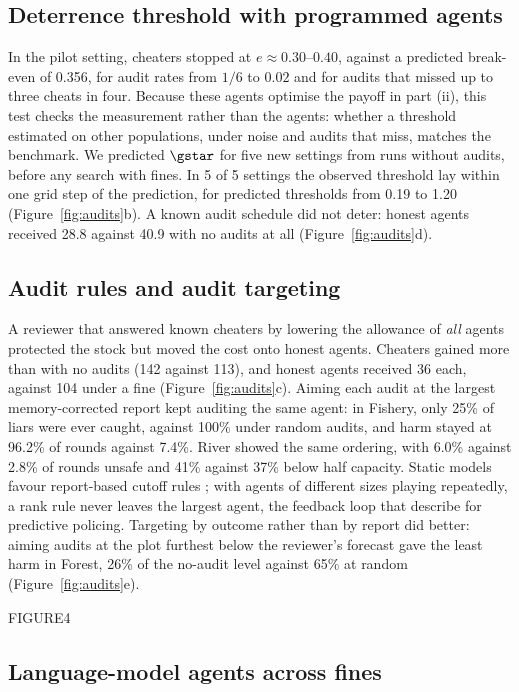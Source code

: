 \subsection{Deterrence threshold with programmed agents}

In the pilot setting, cheaters stopped at $e\approx0.30$--$0.40$, against a predicted break-even of 0.356, for audit rates from $1/6$ to $0.02$ and for audits that missed up to three cheats in four. Because these agents optimise the payoff in part (ii), this test checks the measurement rather than the agents: whether a threshold estimated on other populations, under noise and audits that miss, matches the benchmark. We predicted $\gstar$ for five new settings from runs without audits, before any search with fines. In 5 of 5 settings the observed threshold lay within one grid step of the prediction, for predicted thresholds from 0.19 to 1.20 (Figure~\ref{fig:audits}b). A known audit schedule did not deter: honest agents received 28.8 against 40.9 with no audits at all (Figure~\ref{fig:audits}d).

\subsection{Audit rules and audit targeting}

A reviewer that answered known cheaters by lowering the allowance of \emph{all} agents protected the stock but moved the cost onto honest agents. Cheaters gained more than with no audits (142 against 113), and honest agents received 36 each, against 104 under a fine (Figure~\ref{fig:audits}c). Aiming each audit at the largest memory-corrected report kept auditing the same agent: in Fishery, only 25\% of liars were ever caught, against 100\% under random audits, and harm stayed at 96.2\% of rounds against 7.4\%. River showed the same ordering, with 6.0\% against 2.8\% of rounds unsafe and 41\% against 37\% below half capacity. Static models favour report-based cutoff rules \citep{reinganum1985income}; with agents of different sizes playing repeatedly, a rank rule never leaves the largest agent, the feedback loop that \citet{ensign2018runaway} describe for predictive policing. Targeting by outcome rather than by report did better: aiming audits at the plot furthest below the reviewer's forecast gave the least harm in Forest, 26\% of the no-audit level against 65\% at random (Figure~\ref{fig:audits}e).


FIGURE4

\subsection{Language-model agents across fines}

